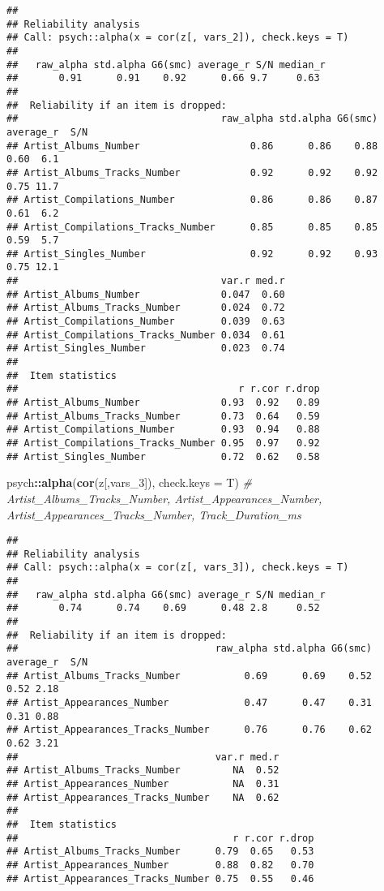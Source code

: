 \documentclass[
]{article}
\newenvironment{Shaded}{\begin{snugshade}}{\end{snugshade}}
\newcommand{\CommentTok}[1]{\textcolor[rgb]{0.56,0.35,0.01}{\textit{#1}}}
\newcommand{\DataTypeTok}[1]{\textcolor[rgb]{0.13,0.29,0.53}{#1}}
\newcommand{\DecValTok}[1]{\textcolor[rgb]{0.00,0.00,0.81}{#1}}
\newcommand{\KeywordTok}[1]{\textcolor[rgb]{0.13,0.29,0.53}{\textbf{#1}}}
\newcommand{\NormalTok}[1]{#1}
\newcommand{\OperatorTok}[1]{\textcolor[rgb]{0.81,0.36,0.00}{\textbf{#1}}}
\begin{document}
\begin{verbatim}
## 
## Reliability analysis   
## Call: psych::alpha(x = cor(z[, vars_2]), check.keys = T)
## 
##   raw_alpha std.alpha G6(smc) average_r S/N median_r
##       0.91      0.91    0.92      0.66 9.7     0.63
## 
##  Reliability if an item is dropped:
##                                   raw_alpha std.alpha G6(smc) average_r  S/N
## Artist_Albums_Number                   0.86      0.86    0.88      0.60  6.1
## Artist_Albums_Tracks_Number            0.92      0.92    0.92      0.75 11.7
## Artist_Compilations_Number             0.86      0.86    0.87      0.61  6.2
## Artist_Compilations_Tracks_Number      0.85      0.85    0.85      0.59  5.7
## Artist_Singles_Number                  0.92      0.92    0.93      0.75 12.1
##                                   var.r med.r
## Artist_Albums_Number              0.047  0.60
## Artist_Albums_Tracks_Number       0.024  0.72
## Artist_Compilations_Number        0.039  0.63
## Artist_Compilations_Tracks_Number 0.034  0.61
## Artist_Singles_Number             0.023  0.74
## 
##  Item statistics 
##                                      r r.cor r.drop
## Artist_Albums_Number              0.93  0.92   0.89
## Artist_Albums_Tracks_Number       0.73  0.64   0.59
## Artist_Compilations_Number        0.93  0.94   0.88
## Artist_Compilations_Tracks_Number 0.95  0.97   0.92
## Artist_Singles_Number             0.72  0.62   0.58
\end{verbatim}

\begin{Shaded}
\begin{Highlighting}[]
\NormalTok{psych}\OperatorTok{::}\KeywordTok{alpha}\NormalTok{(}\KeywordTok{cor}\NormalTok{(z[,vars_}\DecValTok{3}\NormalTok{]), }\DataTypeTok{check.keys =}\NormalTok{ T) }\CommentTok{# Artist_Albums_Tracks_Number, Artist_Appearances_Number, Artist_Appearances_Tracks_Number, Track_Duration_ms }
\end{Highlighting}
\end{Shaded}

\begin{verbatim}
## 
## Reliability analysis   
## Call: psych::alpha(x = cor(z[, vars_3]), check.keys = T)
## 
##   raw_alpha std.alpha G6(smc) average_r S/N median_r
##       0.74      0.74    0.69      0.48 2.8     0.52
## 
##  Reliability if an item is dropped:
##                                  raw_alpha std.alpha G6(smc) average_r  S/N
## Artist_Albums_Tracks_Number           0.69      0.69    0.52      0.52 2.18
## Artist_Appearances_Number             0.47      0.47    0.31      0.31 0.88
## Artist_Appearances_Tracks_Number      0.76      0.76    0.62      0.62 3.21
##                                  var.r med.r
## Artist_Albums_Tracks_Number         NA  0.52
## Artist_Appearances_Number           NA  0.31
## Artist_Appearances_Tracks_Number    NA  0.62
## 
##  Item statistics 
##                                     r r.cor r.drop
## Artist_Albums_Tracks_Number      0.79  0.65   0.53
## Artist_Appearances_Number        0.88  0.82   0.70
## Artist_Appearances_Tracks_Number 0.75  0.55   0.46
\end{verbatim}
\end{document}
